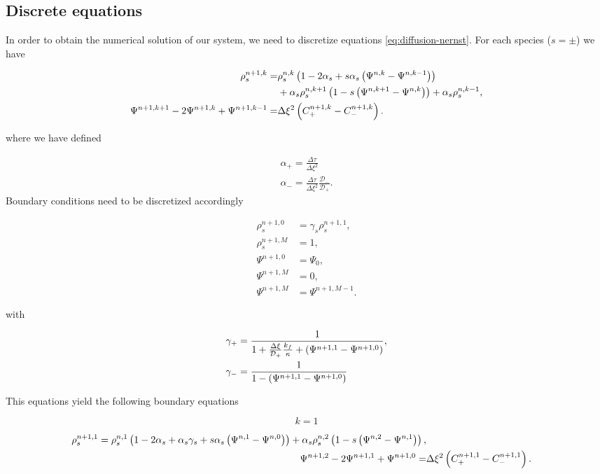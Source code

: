 \subsection{Discrete equations}
\label{appendix:numeric-solution-forced}
In order to obtain the numerical solution of our system, we need to discretize equations \ref{eq:diffusion-nernst}. For each species ($s = \pm$) we have

\begin{align}
    \rho_s^{n+1, k} =& \rho_s^{n,k} \left({1 - 2 \alpha_s + s \alpha_s \left({\Psi^{n, k} - \Psi^{n, k-1}}\right)}\right) \\ & + \alpha_s \rho_s^{n, k+1} \left({1 - s \left({\Psi^{n,k+1} - \Psi^{n,k}}\right)}\right) + \alpha_s \rho_s^{n,k-1},\\
    \Psi^{n+1, k+1} - 2\Psi^{n+1,k} + \Psi^{n+1, k-1} =& \Delta \xi^2 \left({C_+^{n+1, k} - C_-^{n+1, k}}\right).
\end{align}

where we have defined 

\begin{eqnarray*}
	\alpha_+ = \frac{\Delta \tau}{\Delta \xi^2}\\
	\alpha_- = \frac{\Delta \tau}{\Delta \xi^2}\frac{\mathcal{D}_-}{\mathcal{D}_+}.
\end{eqnarray*}
Boundary conditions need to be discretized accordingly

\begin{align}
\rho_s^{n+1, 0} &= \gamma_s \rho_s^{n+1, 1},\\
\rho_s^{n+1, M} &= 1,\\
\Psi^{n+1, 0} &= \Psi_0,\\
\Psi^{n+1, M} &= 0,\\
\Psi^{n+1, M} &= \Psi^{n+1, M-1} .
\end{align}


with

\begin{align}
\gamma_+ &= \frac{1}{1 + \frac{\Delta \xi}{\mathcal{D}_+}\frac{k_f}{\kappa} + \left({\Psi^{n+1, 1}-\Psi^{n+1,0}}\right) }, \\
\gamma_- &= \frac{1}{1 - \left({\Psi^{n+1, 1}-\Psi^{n+1,0}}\right) }
\end{align}

This equations yield the following boundary equations

$$ k=1 $$

\begin{align}
    \rho_s^{n+1, 1} = \rho_s^{n,1} \left({1 - 2 \alpha_s + \alpha_s \gamma_s + s \alpha_s \left({\Psi^{n, 1} - \Psi^{n, 0}}\right)}\right) + \alpha_s \rho_s^{n, 2} \left({1 - s \left({\Psi^{n,2} - \Psi^{n,1}}\right)}\right),\\
    \Psi^{n+1, 2} - 2\Psi^{n+1,1} + \Psi^{n+1, 0} =& \Delta \xi^2\left({C_+^{n+1, 1} - C_-^{n+1, 1}}\right).
\end{align}


